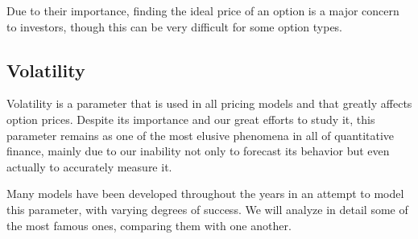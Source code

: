 Due to their importance, finding the ideal price of an option is a major concern to investors, though this can be very difficult for some option types.

\subsection{Volatility}
Volatility is a parameter that is used in all pricing models and that greatly affects option prices. Despite its importance and our great efforts to study it, this parameter remains as one of the most elusive phenomena in all of quantitative finance, mainly due to our inability not only to forecast its behavior but even actually to accurately measure it.

Many models have been developed throughout the years in an attempt to model this parameter, with varying degrees of success. We will analyze in detail some of the most famous ones, comparing them with one another.


